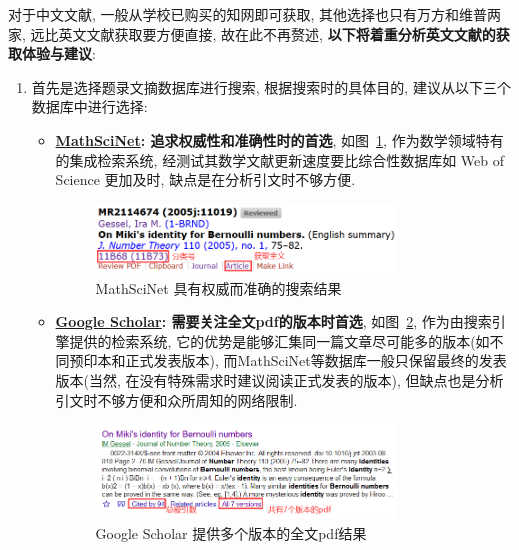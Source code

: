\documentclass{formatBook}
\begin{document}
对于中文文献, 一般从学校已购买的知网即可获取, 其他选择也只有万方和维普两家, 远比英文文献获取要方便直接, 故在此不再赘述, \textbf{以下将着重分析英文文献的获取体验与建议}:
\begin{enumerate}
    \item 首先是选择题录文摘数据库进行搜索, 根据搜索时的具体目的, 建议从以下三个数据库中进行选择:
          \begin{itemize}
              \item \textbf{\href{https://mathscinet.ams.org/mathscinet}{MathSciNet}: 追求权威性和准确性时的首选}, 如图~\ref{fig:mathscinet}, 作为数学领域特有的集成检索系统, 经测试其数学文献更新速度要比综合性数据库如 Web of Science 更加及时, 缺点是在分析引文时不够方便.
                    \begin{figure}[H]
                        \centering
                        \includegraphics[width=0.8\textwidth]{figure/mathscinet.png}
                        \caption{MathSciNet 具有权威而准确的搜索结果}
                        \label{fig:mathscinet}
                    \end{figure}
              \item \textbf{\href{https://scholar.google.com/}{Google Scholar}: 需要关注全文pdf的版本时首选}, 如图~\ref{fig:googlesch}, 作为由搜索引擎提供的检索系统, 它的优势是能够汇集同一篇文章尽可能多的版本(如不同预印本和正式发表版本), 而MathSciNet等数据库一般只保留最终的发表版本(当然, 在没有特殊需求时建议阅读正式发表的版本), 但缺点也是分析引文时不够方便和众所周知的网络限制.
                    \begin{figure}[H]
                        \centering
                        \includegraphics[width=0.8\textwidth]{figure/googlescholar.png}
                        \caption{Google Scholar 提供多个版本的全文pdf结果}
                        \label{fig:googlesch}
                    \end{figure}

\end{itemize}
\end{enumerate}
\end{document}
